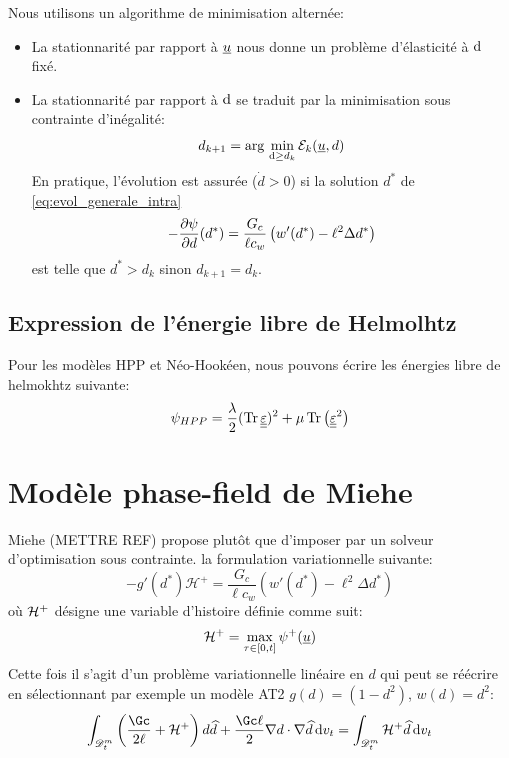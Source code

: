 \documentclass[10pt]{book}
\begin{document}
Nous utilisons un algorithme de minimisation alternée:
\begin{itemize}[label=-]
\item La stationnarité par rapport à $\underline{u}$ nous donne un problème d'élasticité à $\mathrm{d}$ fixé.
\item La stationnarité par rapport à $\mathrm{d}$ se traduit par la minimisation sous contrainte d'inégalité:
\begin{equation}
d_{k+1}= \mathrm{arg}\,\min_{\mathrm{d} \geq d_{k}} \mathcal{E}_{k}(\underline{u},d)
\label{eq:minimisation_intralam_d}
\end{equation}
En pratique, l'évolution est assurée ($\dot{d}>0$) si la solution $d^{*}$ de \eqref{eq:evol_generale_intra}
\begin{equation}
-\dfrac{\partial \psi}{\partial d}(d^{*})=\dfrac{G_{c}}{\ell c_{w}}\left(w'(d^{*})-\ell^{2}\Delta d^{*}\right)
\label{eq:evol_generale_intra}
\end{equation}
est telle que $d^{*}>d_{k}$ sinon $d_{k+1}=d_{k}$.
\end{itemize}
\subsection{Expression de l'énergie libre de Helmolhtz}
Pour les modèles HPP et Néo-Hookéen, nous pouvons écrire les énergies libre de helmokhtz suivante:
$$\psi_{HPP}=\dfrac{\lambda}{2}(\tr\DefoHPP)^{2}+\mu\tr\left(\DefoHPP^{2}\right)$$
\section{Modèle phase-field de Miehe}
Miehe (METTRE REF) propose plutôt que d'imposer par un solveur d'optimisation sous contrainte. la formulation variationnelle suivante:
$$-g'(d^{*})\mathcal{H}^{+}=\dfrac{G_{c}}{\ell c_{w}}\left(w'(d^{*})-\ell^{2}\Delta d^{*}\right)$$
où $\mathcal{H}^{+}$ désigne une variable d'histoire définie comme suit:
$$\mathcal{H}^{+}=\max_{\tau\in[0,t]}\psi^{+}(\underline{u})$$
Cette fois il s'agit d'un problème variationnelle linéaire en $d$ qui peut se réécrire en sélectionnant par exemple un modèle AT2 $g(d)=(1-d^{2})$, $w(d)=d^{2}$:
$$\int_{\Dmt}\left(\dfrac{\Gc}{2\ell}+\Hh^{+}\right)d\hat{d}+\dfrac{\Gc\ell}{2}\nabla d\cdot\nabla\hat{d}\dvt = \int_{\Dmt}\Hh^{+}\hat{d}\dvt$$
\end{document}

